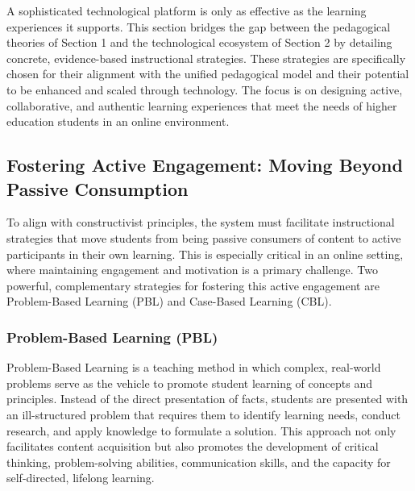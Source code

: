 \documentclass{article}
\begin{document}
A sophisticated technological platform is only as effective as the learning experiences it supports. This section bridges the gap between the pedagogical theories of Section 1 and the technological ecosystem of Section 2 by detailing concrete, evidence-based instructional strategies. These strategies are specifically chosen for their alignment with the unified pedagogical model and their potential to be enhanced and scaled through technology. The focus is on designing active, collaborative, and authentic learning experiences that meet the needs of higher education students in an online environment.

\subsection{Fostering Active Engagement: Moving Beyond Passive Consumption}

To align with constructivist principles, the system must facilitate instructional strategies that move students from being passive consumers of content to active participants in their own learning. This is especially critical in an online setting, where maintaining engagement and motivation is a primary challenge.\cite{47, 48} Two powerful, complementary strategies for fostering this active engagement are Problem-Based Learning (PBL) and Case-Based Learning (CBL).

\subsubsection{Problem-Based Learning (PBL)}

Problem-Based Learning is a teaching method in which complex, real-world problems serve as the vehicle to promote student learning of concepts and principles.\cite{49} Instead of the direct presentation of facts, students are presented with an ill-structured problem that requires them to identify learning needs, conduct research, and apply knowledge to formulate a solution.\cite{49, 50} This approach not only facilitates content acquisition but also promotes the development of critical thinking, problem-solving abilities, communication skills, and the capacity for self-directed, lifelong learning.\cite{49, 50, 51}
\end{document}
